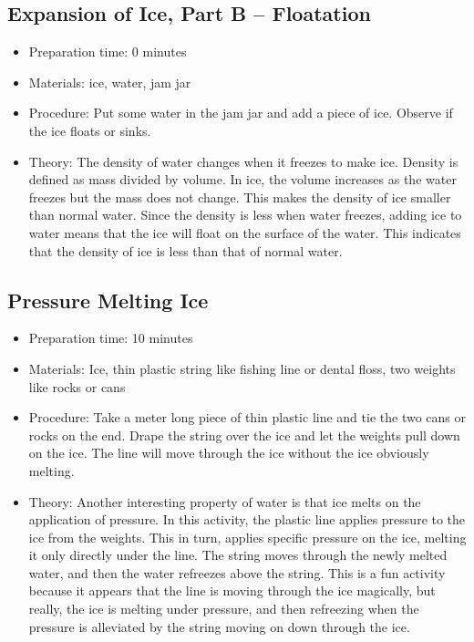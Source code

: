 \subsection{Expansion of Ice, Part B -- Floatation}
\begin{itemize}
\item{Preparation time: 0 minutes}
\item{Materials: ice, water, jam jar}
\item{Procedure: Put some water in the jam jar and add a piece of ice. Observe if the ice floats or sinks.}
\item{Theory: The density of water changes when it freezes to make ice. Density is defined as mass divided by volume. In ice, the volume increases as the water freezes but the mass does not change. This makes the density of ice smaller than normal water. Since the density is less when water freezes, adding ice to water means that the ice will float on the surface of the water. This indicates that the density of ice is less than that of normal water.}
\end{itemize}

\subsection{Pressure Melting Ice}
\begin{itemize}
\item{Preparation time: 10 minutes}
\item{Materials: Ice, thin plastic string like fishing line or dental floss, two weights like rocks or cans}
\item{Procedure: Take a meter long piece of thin plastic line and tie the two cans or rocks on the end. Drape the string over the ice and let the weights pull down on the ice. The line will move through the ice without the ice obviously melting.}
\item{Theory: Another interesting property of water is that ice melts on the application of pressure. In this activity, the plastic line applies pressure to the ice from the weights. This in turn, applies specific pressure on the ice, melting it only directly under the line. The string moves through the newly melted water, and then the water refreezes above the string. This is a fun activity because it appears that the line is moving through the ice magically, but really, the ice is melting under pressure, and then refreezing when the pressure is alleviated by the string moving on down through the ice.}
\end{itemize}
